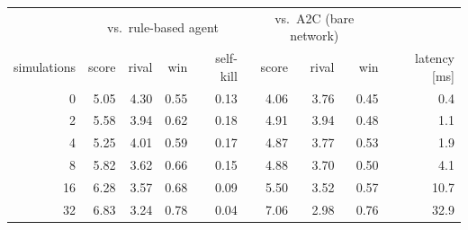 \begin{tabular}{r rrrr rrr r}
\hline
 & \multicolumn{4}{c}{vs.\ rule-based agent} & \multicolumn{3}{c}{vs.\ A2C (bare network)} & \\
simulations & score & rival & win & self-kill & score & rival & win & latency [ms] \\
\hline
0 & 5.05 & 4.30 & 0.55 & 0.13 & 4.06 & 3.76 & 0.45 & 0.4 \\
2 & 5.58 & 3.94 & 0.62 & 0.18 & 4.91 & 3.94 & 0.48 & 1.1 \\
4 & 5.25 & 4.01 & 0.59 & 0.17 & 4.87 & 3.77 & 0.53 & 1.9 \\
8 & 5.82 & 3.62 & 0.66 & 0.15 & 4.88 & 3.70 & 0.50 & 4.1 \\
16 & 6.28 & 3.57 & 0.68 & 0.09 & 5.50 & 3.52 & 0.57 & 10.7 \\
32 & 6.83 & 3.24 & 0.78 & 0.04 & 7.06 & 2.98 & 0.76 & 32.9 \\
\hline
\end{tabular}

